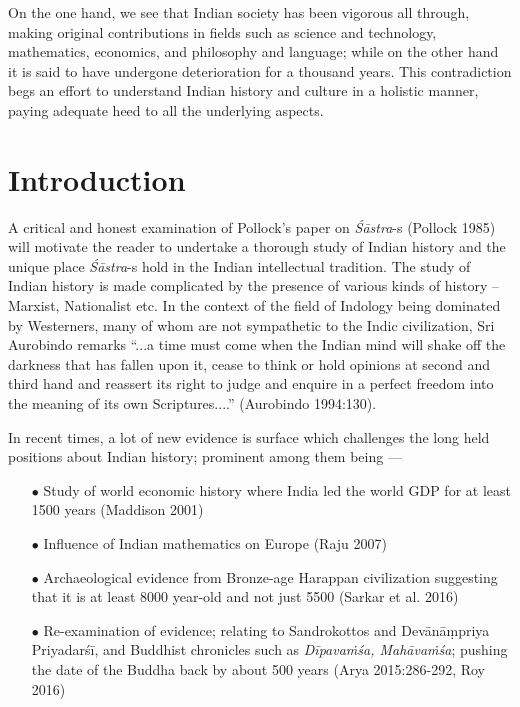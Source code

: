 On the one hand, we see that Indian society has been vigorous all through, making original contributions in ﬁelds such as science and technology, mathematics, economics, and philosophy and language; while on the other hand it is said to have undergone deterioration for a thousand years. This contradiction begs an effort to understand Indian history and culture in a holistic manner, paying adequate heed to all the underlying aspects.

\section{Introduction}\label{art12-sec1}

A critical and honest examination of Pollock's paper on {\sl Śāstra}-s (Pollock 1985) will motivate the reader to undertake a thorough study of Indian history and the unique place {\sl Śāstra}-s hold in the Indian intellectual tradition. The study of Indian history is made complicated by the presence of various kinds of history -- Marxist, Nationalist etc. In the context of the ﬁeld of Indology being dominated by Westerners, many of whom are not sympathetic to the Indic civilization, Sri Aurobindo remarks ``...a time must come when the Indian mind will shake off the darkness that has fallen upon it, cease to think or hold opinions at second and third hand and reassert its right to judge and enquire in a perfect freedom into the meaning of its own Scriptures....'' (Aurobindo 1994:130). 

In recent times, a lot of new evidence is surface which challenges the long held positions about Indian history; prominent among them being ---
\begin{itemize}
\itemsep=1pt
\item[$\bullet$] Study of world economic history where India led the world GDP for at least 1500 years (Maddison 2001)

\item[$\bullet$] Inﬂuence of Indian mathematics on Europe (Raju 2007)

\item[$\bullet$] Archaeological evidence from Bronze-age Harappan civilization suggesting that it is at least 8000 year-old and not just 5500 (Sarkar et al. 2016)

\item[$\bullet$] Re-examination of evidence; relating to Sandrokottos and Devānāṃpriya Priyadarśī, and Buddhist chronicles such as {\sl Dīpavaṁśa, Mahāvaṁśa}; pushing the date of the Buddha back by about 500 years (Arya 2015:286-292, Roy 2016)
\end{itemize}

